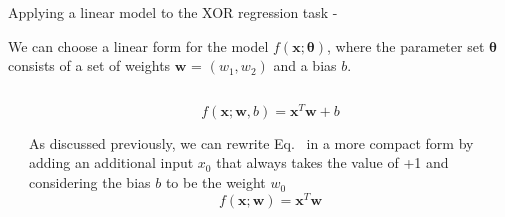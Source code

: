 %
%
%

\begin{frame}[t,allowframebreaks]{Applying a linear model to the XOR regression task -} 

    We can choose a linear form for the model $f(\mathbf{x};\mathbf{\theta})$,
    where the parameter set $\mathbf{\theta}$ consists 
    of a set of weights $\mathbf{w}$ = $(w_1,w_2)$ and a bias $b$.        

    \begin{columns}[t]
        \begin{column}{0.50\textwidth}
            \vspace{-0.6cm}
            \begin{center}
            \end{center}        
        \end{column}
        \begin{column}{0.50\textwidth}
            \begin{equation}
                f(\mathbf{x};\mathbf{w},b) = \mathbf{x}^{T} \mathbf{w} + b
                \label{eq:learn_xor_linear_model_1}
            \end{equation}

            As discussed previously, we can rewrite Eq.~\label{eq:learn_xor_linear_model_1}
            in a more compact form by adding an additional input $x_0$ that always takes the value of +1 
            and considering the bias $b$ to be the weight $w_0$
            \begin{equation}
                f(\mathbf{x};\mathbf{w}) = \mathbf{x}^{T} \mathbf{w}
                \label{eq:learn_xor_linear_model_2}
            \end{equation}
        \end{column}
    \end{columns}
      

\end{frame}
